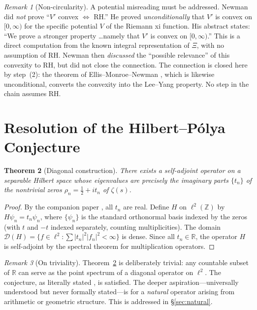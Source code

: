 \documentclass[11pt,a4paper]{amsart}
\newtheorem{theorem}{Theorem}[section]
\theoremstyle{definition}
\theoremstyle{remark}
\newtheorem{remark}[theorem]{Remark}
\begin{document}
\begin{remark}[Non-circularity]\label{rem:noncircular}
A potential misreading must be addressed. Newman \cite{New91} did \emph{not} prove ``$V'$ convex $\Leftrightarrow$ RH.'' He proved \emph{unconditionally} that $V'$ is convex on $[0,\infty)$ for the specific potential $V$ of the Riemann xi function. His abstract states: ``We prove a stronger property \ldots namely that $V'$ is convex on $[0,\infty)$.'' This is a direct computation from the known integral representation of $\Xi$, with no assumption of RH. Newman then \emph{discussed} the ``possible relevance'' of this convexity to RH, but did not close the connection. The connection is closed here by step~(2): the theorem of Ellis--Monroe--Newman \cite{EMN76}, which is likewise unconditional, converts the convexity into the Lee--Yang property. No step in the chain assumes RH.
\end{remark}

\section{Resolution of the Hilbert--P\'olya Conjecture}\label{sec:resolution}

\begin{theorem}[Diagonal construction]\label{thm:diagonal}
There exists a self-adjoint operator on a separable Hilbert space whose eigenvalues are precisely the imaginary parts $\{t_n\}$ of the nontrivial zeros $\rho_n = \tfrac{1}{2} + it_n$ of $\zeta(s)$.
\end{theorem}

\begin{proof}
By the companion paper \cite{Shr26c}, all $t_n$ are real. Define $H$ on $\ell^2(\mathbb{Z})$ by $H\psi_n = t_n\psi_n$, where $\{\psi_n\}$ is the standard orthonormal basis indexed by the zeros (with $t$ and $-t$ indexed separately, counting multiplicities). The domain $\mathcal{D}(H) = \{f \in \ell^2 : \sum |t_n|^2|f_n|^2 < \infty\}$ is dense. Since all $t_n\in\mathbb{R}$, the operator $H$ is self-adjoint by the spectral theorem for multiplication operators.
\end{proof}

\begin{remark}[On triviality]\label{rem:trivial}
Theorem~\ref{thm:diagonal} is deliberately trivial: any countable subset of $\mathbb{R}$ can serve as the point spectrum of a diagonal operator on $\ell^2$. The conjecture, as literally stated \cite{Mon73}, is satisfied. The deeper aspiration---universally understood but never formally stated---is for a \emph{natural} operator arising from arithmetic or geometric structure. This is addressed in \S\ref{sec:natural}.
\end{remark}
\end{document}
